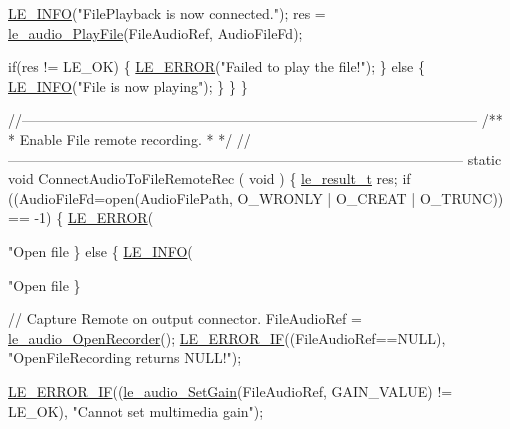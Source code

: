 \begin{DoxyCodeInclude}
{{{        \hyperlink{le__log_8h_a23e6d206faa64f612045d688cdde5808}{LE\_INFO}(\textcolor{stringliteral}{"FilePlayback is now connected."});
        res = \hyperlink{le__audio__interface_8h_aea2c5d0b394cfab87503639c534300c9}{le\_audio\_PlayFile}(FileAudioRef, AudioFileFd);

        \textcolor{keywordflow}{if}(res != LE\_OK)
        \{
            \hyperlink{le__log_8h_a353590f91b3143a7ba3a416ae5a50c3d}{LE\_ERROR}(\textcolor{stringliteral}{"Failed to play the file!"});
        \}
        \textcolor{keywordflow}{else}
        \{
            \hyperlink{le__log_8h_a23e6d206faa64f612045d688cdde5808}{LE\_INFO}(\textcolor{stringliteral}{"File is now playing"});
        \}
    \}
\}

\textcolor{comment}{//--------------------------------------------------------------------------------------------------}\textcolor{comment}{}
\textcolor{comment}{/**}
\textcolor{comment}{ * Enable File remote recording.}
\textcolor{comment}{ *}
\textcolor{comment}{ */}
\textcolor{comment}{//--------------------------------------------------------------------------------------------------}
\textcolor{keyword}{static} \textcolor{keywordtype}{void} ConnectAudioToFileRemoteRec
(
    \textcolor{keywordtype}{void}
)
\{
    \hyperlink{le__basics_8h_a1cca095ed6ebab24b57a636382a6c86c}{le\_result\_t} res;
    \textcolor{keywordflow}{if} ((AudioFileFd=open(AudioFilePath, O\_WRONLY | O\_CREAT | O\_TRUNC)) == -1)
    \{
        \hyperlink{le__log_8h_a353590f91b3143a7ba3a416ae5a50c3d}{LE\_ERROR}(\textcolor{stringliteral}{"Open file %
    \}
    \textcolor{keywordflow}{else}
    \{
        \hyperlink{le__log_8h_a23e6d206faa64f612045d688cdde5808}{LE\_INFO}(\textcolor{stringliteral}{"Open file %
    \}

    \textcolor{comment}{// Capture Remote on output connector.}
    FileAudioRef = \hyperlink{le__audio__interface_8h_aeac35459c36748a4471b6d45f1ebeb24}{le\_audio\_OpenRecorder}();
    \hyperlink{le__log_8h_aceaf11a11691d6c676e36dd317b38dbd}{LE\_ERROR\_IF}((FileAudioRef==NULL), \textcolor{stringliteral}{"OpenFileRecording returns NULL!"});

    \hyperlink{le__log_8h_aceaf11a11691d6c676e36dd317b38dbd}{LE\_ERROR\_IF}((\hyperlink{le__audio__interface_8h_a65f11540e6af03a3494b6b9be76ba5fc}{le\_audio\_SetGain}(FileAudioRef, GAIN\_VALUE) != LE\_OK), \textcolor{stringliteral}{"Cannot
       set multimedia gain"});

}}}}}
\end{DoxyCodeInclude}
